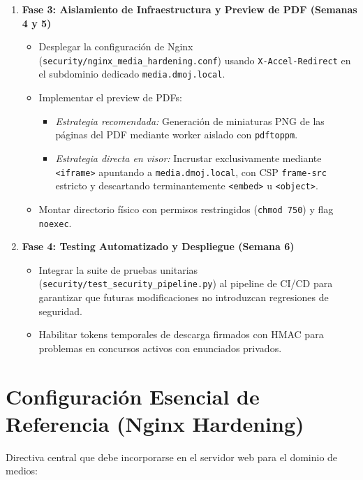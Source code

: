 \documentclass[11pt,a4paper]{article}
\begin{document}
\begin{enumerate}[leftmargin=*]
    \item \textbf{Fase 3: Aislamiento de Infraestructura y Preview de PDF (Semanas 4 y 5)}
    \begin{itemize}
        \item Desplegar la configuración de Nginx (\texttt{security/nginx\_media\_hardening.conf}) usando \texttt{X-Accel-Redirect} en el subdominio dedicado \texttt{media.dmoj.local}.
        \item Implementar el preview de PDFs:
        \begin{itemize}
            \item \textit{Estrategia recomendada:} Generación de miniaturas PNG de las páginas del PDF mediante worker aislado con \texttt{pdftoppm}.
            \item \textit{Estrategia directa en visor:} Incrustar exclusivamente mediante \texttt{\textless iframe\textgreater} apuntando a \texttt{media.dmoj.local}, con CSP \texttt{frame-src} estricto y descartando terminantemente \texttt{\textless embed\textgreater} u \texttt{\textless object\textgreater}.
        \end{itemize}
        \item Montar directorio físico con permisos restringidos (\texttt{chmod 750}) y flag \texttt{noexec}.
    \end{itemize}

    \item \textbf{Fase 4: Testing Automatizado y Despliegue (Semana 6)}
    \begin{itemize}
        \item Integrar la suite de pruebas unitarias (\texttt{security/test\_security\_pipeline.py}) al pipeline de CI/CD para garantizar que futuras modificaciones no introduzcan regresiones de seguridad.
        \item Habilitar tokens temporales de descarga firmados con HMAC para problemas en concursos activos con enunciados privados.
    \end{itemize}
\end{enumerate}

\section{Configuración Esencial de Referencia (Nginx Hardening)}

Directiva central que debe incorporarse en el servidor web para el dominio de medios:
\end{document}
